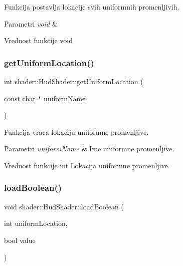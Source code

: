 Funkcija postavlja lokacije svih uniformnih promenljivih. 


\begin{DoxyParams}{Parametri}
{\em void} & \\
\hline
\end{DoxyParams}
\begin{DoxyReturn}{Vrednost funkcije}
void 
\end{DoxyReturn}
\mbox{\label{classshader_1_1HudShader_af9ed170816ba27a227dd8ce7c6e0aba4}} 
\subsubsection{\texorpdfstring{get\+Uniform\+Location()}{getUniformLocation()}}
{\footnotesize\ttfamily int shader\+::\+Hud\+Shader\+::get\+Uniform\+Location (\begin{DoxyParamCaption}\item[{const char $\ast$}]{uniform\+Name }\end{DoxyParamCaption})}



Funkcija vraca lokaciju uniformne promenljive. 


\begin{DoxyParams}{Parametri}
{\em uniform\+Name} & Ime uniformne promenljive. \\
\hline
\end{DoxyParams}
\begin{DoxyReturn}{Vrednost funkcije}
int Lokacija uniformne promenljive. 
\end{DoxyReturn}
\mbox{\label{classshader_1_1HudShader_a6e043863cf72ace1afe77e8fbe101b59}} 
\subsubsection{\texorpdfstring{load\+Boolean()}{loadBoolean()}}
{\footnotesize\ttfamily void shader\+::\+Hud\+Shader\+::load\+Boolean (\begin{DoxyParamCaption}\item[{int}]{uniform\+Location,  }\item[{bool}]{value }\end{DoxyParamCaption})}



